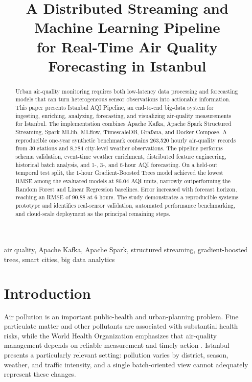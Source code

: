 \documentclass[conference]{IEEEtran}
\title{A Distributed Streaming and Machine Learning Pipeline\\
for Real-Time Air Quality Forecasting in Istanbul}
\author{
\IEEEauthorblockN{Ahmet Can Hatipoğlu, Dicle Çoban, Funda Çelik}
\IEEEauthorblockA{
Department of Computer Engineering, Gebze Technical University\\
Big Data Analytics Course}
}
\newcommand{\system}{Istanbul AQI Pipeline}
\begin{document}
\maketitle

\begin{abstract}
Urban air-quality monitoring requires both low-latency data processing and
forecasting models that can turn heterogeneous sensor observations into
actionable information. This paper presents \system, an end-to-end big-data
system for ingesting, enriching, analyzing, forecasting, and visualizing
air-quality measurements for Istanbul. The implementation combines Apache
Kafka, Apache Spark Structured Streaming, Spark MLlib, MLflow, TimescaleDB,
Grafana, and Docker Compose. A reproducible one-year synthetic benchmark
contains 263,520 hourly air-quality records from 30 stations and 8,784
city-level weather observations. The pipeline performs schema validation,
event-time weather enrichment, distributed feature engineering, historical
batch analysis, and 1-, 3-, and 6-hour AQI forecasting. On a held-out temporal
test split, the 1-hour Gradient-Boosted Trees model achieved the lowest RMSE
among the evaluated models at 86.04 AQI units, narrowly outperforming the
Random Forest and Linear Regression baselines. Error increased with forecast
horizon, reaching an RMSE of 90.88 at 6 hours. The study demonstrates a reproducible systems
prototype and identifies real-sensor validation, automated performance
benchmarking, and cloud-scale deployment as the principal remaining steps.
\end{abstract}

\begin{IEEEkeywords}
air quality, Apache Kafka, Apache Spark, structured streaming, gradient-boosted
trees, smart cities, big data analytics
\end{IEEEkeywords}

\section{Introduction}
Air pollution is an important public-health and urban-planning problem.
Fine particulate matter and other pollutants are associated with substantial
health risks, while the World Health Organization emphasizes that air-quality
management depends on reliable measurement and timely action
\cite{who_guidelines}. Istanbul presents a particularly relevant setting:
pollution varies by district, season, weather, and traffic intensity, and a
single batch-oriented view cannot adequately represent these changes.
\end{document}
